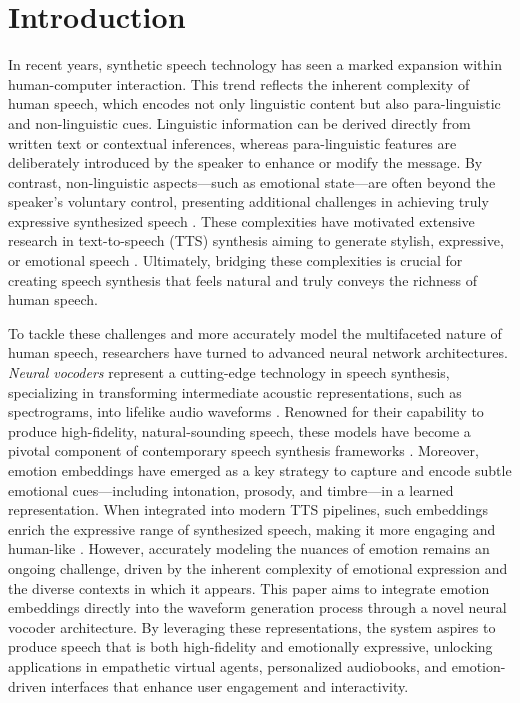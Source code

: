\documentclass[12pt,a4paper]{article}
\begin{document}
\section{Introduction}

In recent years, synthetic speech technology has seen a marked expansion within
human-computer interaction. This trend reflects the inherent complexity of human
speech, which encodes not only linguistic content but also para-linguistic and
non-linguistic cues. Linguistic information can be derived directly from written
text or contextual inferences, whereas para-linguistic features are deliberately
introduced by the speaker to enhance or modify the message. By contrast,
non-linguistic aspects---such as emotional state---are often beyond the
speaker’s voluntary control, presenting additional challenges in achieving truly
expressive synthesized speech \cite{an2021emotional}. These complexities have
motivated extensive research in text-to-speech (TTS) synthesis aiming to
generate stylish, expressive, or emotional speech \cite{nose2007style,
henter2017principles, lorenzotrueba2018investigating, wang2018style,
skerry2018towards, wu2018feature, wu2018rapid, liu2020multi}. Ultimately,
bridging these complexities is crucial for creating speech synthesis that feels
natural and truly conveys the richness of human speech.

To tackle these challenges and more accurately model the multifaceted nature of
human speech, researchers have turned to advanced neural network architectures.
\emph{Neural vocoders} represent a cutting-edge technology in speech synthesis,
specializing in transforming intermediate acoustic representations, such as
spectrograms, into lifelike audio waveforms \cite{oord2016wavenet,
jang2021univnet, siuzdak2022vocos}. Renowned for their capability to produce
high-fidelity, natural-sounding speech, these models have become a pivotal
component of contemporary speech synthesis frameworks
\cite{albadawy2021vocbench, zarazaga2022neural}. Moreover, emotion embeddings
have emerged as a key strategy to capture and encode subtle emotional
cues---including intonation, prosody, and timbre---in a learned representation.
When integrated into modern TTS pipelines, such embeddings enrich the expressive
range of synthesized speech, making it more engaging and human-like
\cite{lei2022msemotts}. However, accurately modeling the nuances of emotion
remains an ongoing challenge, driven by the inherent complexity of emotional
expression and the diverse contexts in which it
appears\cite{raptis2014expressive}. This paper aims to integrate emotion
embeddings directly into the waveform generation process through a novel neural
vocoder architecture. By leveraging these representations, the system aspires to
produce speech that is both high-fidelity and emotionally expressive, unlocking
applications in empathetic virtual agents, personalized audiobooks, and
emotion-driven interfaces that enhance user engagement and interactivity.
\end{document}
